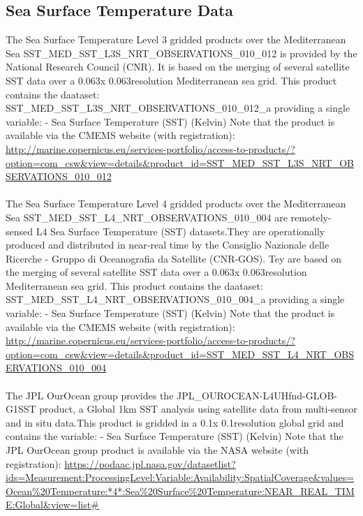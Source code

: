 \documentclass[12pt,a4paper]{article}
\begin{document}
\subsection{Sea Surface Temperature Data} 
The Sea Surface Temperature Level 3 gridded products over the Mediterranean Sea SST\_MED\_SST\_L3S\_NRT\_OBSERVATIONS\_010\_012 is provided by the National Research Council (CNR). It is based on the merging of several satellite SST data over a 0.063\degre x 0.063\degre resolution Mediterranean sea grid. This product contains the daataset: SST\_MED\_SST\_L3S\_NRT\_OBSERVATIONS\_010\_012\_a providing a single variable: \newline 
- Sea Surface Temperature (SST) (Kelvin) \newline 
Note that the product is available via the CMEMS website  (with registration): \url{http://marine.copernicus.eu/services-portfolio/access-to-products/?option=com_csw&view=details&product_id=SST_MED_SST_L3S_NRT_OBSERVATIONS_010_012
}
\\
\\
The Sea Surface Temperature Level 4 gridded products over the Mediterranean Sea SST\_MED\_SST\_L4\_NRT\_OBSERVATIONS\_010\_004 are remotely-sensed L4 Sea Surface Temperature (SST) datasets.They are operationally produced and distributed in near-real time by the Consiglio Nazionale delle Ricerche - Gruppo di Oceanografia da Satellite (CNR-GOS). Tey are based on the merging of several satellite SST data over a 0.063\degre x 0.063\degre resolution Mediterranean sea grid. This product contains the daataset: SST\_MED\_SST\_L4\_NRT\_OBSERVATIONS\_010\_004\_a providing a single variable: \newline 
- Sea Surface Temperature (SST) (Kelvin) \newline 
Note that the product is available via the CMEMS website  (with registration): \url{http://marine.copernicus.eu/services-portfolio/access-to-products/?option=com_csw&view=details&product_id=SST_MED_SST_L4_NRT_OBSERVATIONS_010_004
}
\\ 
\\
The JPL OurOcean group provides the JPL\_OUROCEAN-L4UHfnd-GLOB-G1SST product, a Global 1km SST analysis using satellite data from multi-sensor and in situ data.This product is gridded in a 0.1\degre x 0.1\degre resolution global grid and contains the variable: \newline
- Sea Surface Temperature (SST) (Kelvin) \newline
Note that the JPL OurOcean group product is available via the NASA website  (with 
registration): \url{https://podaac.jpl.nasa.gov/datasetlist?ids=Measurement:ProcessingLevel:Variable:Availability:SpatialCoverage&values=Ocean%20Temperature:*4*:Sea%20Surface%20Temperature:NEAR_REAL_TIME:Global&view=list#}
\\
\end{document}
